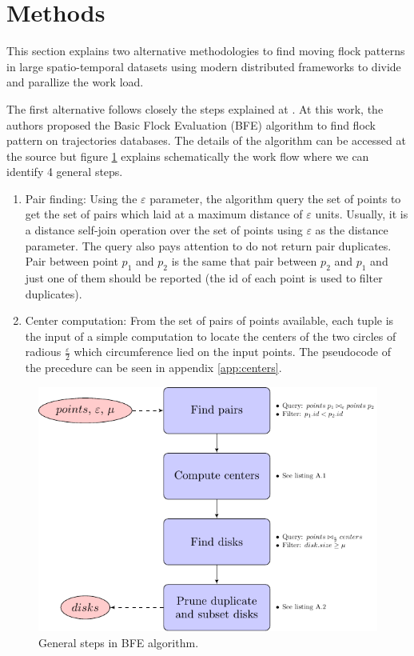 \documentclass[journal,onecolumn]{IEEEtran}
\begin{document}
% 

\section{Methods}
This section explains two alternative methodologies to find moving flock patterns in large spatio-temporal datasets using modern distributed frameworks to divide and parallize the work load.

The first alternative follows closely the steps explained at \cite{vieira_-line_2009}.  At this work, the authors proposed the Basic Flock Evaluation (BFE) algorithm to find flock pattern on trajectories databases.  The details of the algorithm can be accessed at the source but figure \ref{fig:flowchart1} explains schematically the work flow where we can identify 4 general steps.

\begin{enumerate}
    \item Pair finding:  Using the $\varepsilon$ parameter, the algorithm query the set of points to get the set of pairs which laid at a maximum distance of $\varepsilon$ units.  Usually, it is a distance self-join operation over the set of points using $\varepsilon$ as the distance parameter.  The query also pays attention to do not return pair duplicates.  Pair between point $p_1$ and $p_2$ is the same that pair between $p_2$ and $p_1$ and just one of them should be reported (the id of each point is used to filter duplicates).
    \item Center computation:  From the set of pairs of points available, each tuple is the input of a simple computation to locate the centers of the two circles of radious $\frac{\varepsilon}{2}$ which circumference lied on the input points.  The pseudocode of the precedure can be seen in appendix \ref{app:centers}.
\end{enumerate}

\begin{figure}[b]
    \centering
    \includegraphics{figures/flowchart1}
    \caption{General steps in BFE algorithm.}\label{fig:flowchart1}
\end{figure}
\end{document}
